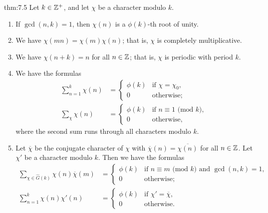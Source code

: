 \begin{theo}{thm:7.5}
    Let $k \in \mathbb{Z}^+$, and let $\chi$ be a character modulo $k$. 
    \begin{enumerate}[(1)]
        \item If $\gcd(n, k) = 1$, then $\chi(n)$ is a $\phi(k)$-th root of unity. 
        \item We have $\chi(mn) = \chi(m)\chi(n)$; that is, $\chi$ is completely 
        multiplicative. 
        \item We have $\chi(n+k) = n$ for all $n \in \mathbb{Z}$; that is, $\chi$ is 
        periodic with period $k$. 
        \item We have the formulas 
        \begin{align*}
            \sum_{n=1}^k \chi(n) &= \begin{cases}
                \phi(k) & \text{if } \chi = \chi_0, \\ 
                0 & \text{otherwise;}
            \end{cases} \\ 
            \sum_{\chi} \chi(n) &= \begin{cases} 
                \phi(k) & \text{if } n \equiv 1 \text{ (mod $k$)}, \\ 
                0 & \text{otherwise,}
            \end{cases}
        \end{align*}
        where the second sum runs through all characters modulo $k$. 
        \item Let $\overline\chi$ be the conjugate character of $\chi$ with $\overline\chi(n) 
        = \overline{\chi(n)}$ for all $n \in \mathbb{Z}$. Let $\chi'$ be a character modulo 
        $k$. Then we have the formulas 
        \begin{align*}
            \sum_{\chi\in\hat G(k)} \chi(n) \overline\chi(m) &= \begin{cases}
                \phi(k) & \text{if } n \equiv m \text{ (mod $k$) and } \gcd(n, k) = 1, \\ 
                0 & \text{otherwise;}
            \end{cases} \\ 
            \sum_{n=1}^k \chi(n) \chi'(n) &= \begin{cases} 
                \phi(k) & \text{if } \chi' = \overline\chi, \\ 
                0 & \text{otherwise.}
            \end{cases}
        \end{align*}
    \end{enumerate}
\end{theo}
